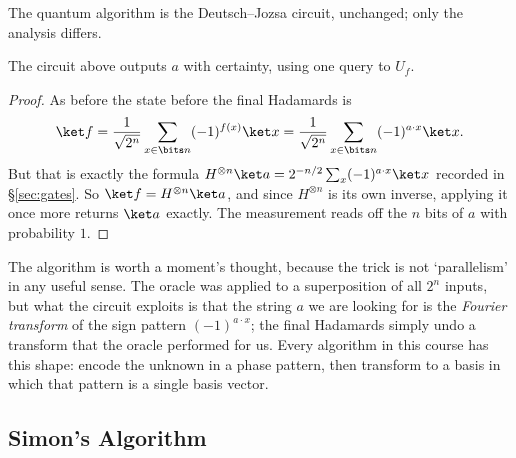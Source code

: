 The quantum algorithm is the Deutsch--Jozsa circuit, unchanged; only the analysis differs.

\begin{center}
\end{center}

\begin{theorem}
	The circuit above outputs $a$ with certainty, using one query to $U_f$.
\end{theorem}

\begin{proof}
	As before the state before the final Hadamards is
	$$\ket f = \frac1{\sqrt{2^n}}\sum_{x\in\bits n}(-1)^{f(x)}\ket x = \frac{1}{\sqrt{2^n}}\sum_{x\in\bits n}(-1)^{a\cdot x}\ket x.$$
	But that is exactly the formula $H^{\otimes n}\ket a = 2^{-n/2}\sum_x(-1)^{a\cdot x}\ket x$ recorded in \S\ref{sec:gates}. So $\ket f = H^{\otimes n}\ket a$, and since $H^{\otimes n}$ is its own inverse, applying it once more returns $\ket a$ exactly. The measurement reads off the $n$ bits of $a$ with probability $1$.
\end{proof}

The algorithm is worth a moment's thought, because the trick is not `parallelism' in any useful sense. The oracle was applied to a superposition of all $2^n$ inputs, but what the circuit exploits is that the string $a$ we are looking for is the \emph{Fourier transform} of the sign pattern $(-1)^{a\cdot x}$; the final Hadamards simply undo a transform that the oracle performed for us. Every algorithm in this course has this shape: encode the unknown in a phase pattern, then transform to a basis in which that pattern is a single basis vector.

\subsection{Simon's Algorithm}\label{sec:simon}

